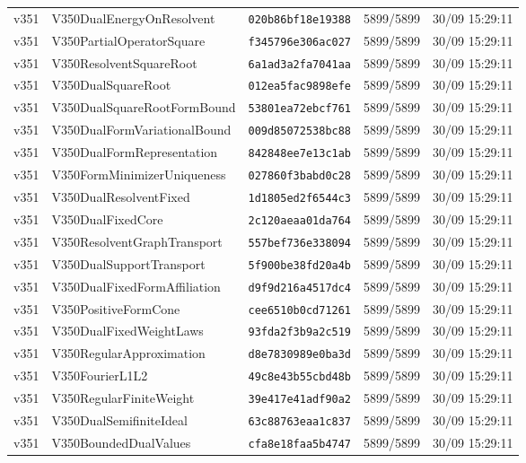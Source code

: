 \documentclass[11pt]{article}
\theoremstyle{definition}\newtheorem{deriv}{Derivation}
\begin{document}
{\begin{longtable}{@{}lllll@{}}
v351 & V350DualEnergyOnResolvent & \texttt{020b86bf18e19388} & 5899/5899 & 30/09 15:29:11 \\
v351 & V350PartialOperatorSquare & \texttt{f345796e306ac027} & 5899/5899 & 30/09 15:29:11 \\
v351 & V350ResolventSquareRoot & \texttt{6a1ad3a2fa7041aa} & 5899/5899 & 30/09 15:29:11 \\
v351 & V350DualSquareRoot & \texttt{012ea5fac9898efe} & 5899/5899 & 30/09 15:29:11 \\
v351 & V350DualSquareRootFormBound & \texttt{53801ea72ebcf761} & 5899/5899 & 30/09 15:29:11 \\
v351 & V350DualFormVariationalBound & \texttt{009d85072538bc88} & 5899/5899 & 30/09 15:29:11 \\
v351 & V350DualFormRepresentation & \texttt{842848ee7e13c1ab} & 5899/5899 & 30/09 15:29:11 \\
v351 & V350FormMinimizerUniqueness & \texttt{027860f3babd0c28} & 5899/5899 & 30/09 15:29:11 \\
v351 & V350DualResolventFixed & \texttt{1d1805ed2f6544c3} & 5899/5899 & 30/09 15:29:11 \\
v351 & V350DualFixedCore & \texttt{2c120aeaa01da764} & 5899/5899 & 30/09 15:29:11 \\
v351 & V350ResolventGraphTransport & \texttt{557bef736e338094} & 5899/5899 & 30/09 15:29:11 \\
v351 & V350DualSupportTransport & \texttt{5f900be38fd20a4b} & 5899/5899 & 30/09 15:29:11 \\
v351 & V350DualFixedFormAffiliation & \texttt{d9f9d216a4517dc4} & 5899/5899 & 30/09 15:29:11 \\
v351 & V350PositiveFormCone & \texttt{cee6510b0cd71261} & 5899/5899 & 30/09 15:29:11 \\
v351 & V350DualFixedWeightLaws & \texttt{93fda2f3b9a2c519} & 5899/5899 & 30/09 15:29:11 \\
v351 & V350RegularApproximation & \texttt{d8e7830989e0ba3d} & 5899/5899 & 30/09 15:29:11 \\
v351 & V350FourierL1L2 & \texttt{49c8e43b55cbd48b} & 5899/5899 & 30/09 15:29:11 \\
v351 & V350RegularFiniteWeight & \texttt{39e417e41adf90a2} & 5899/5899 & 30/09 15:29:11 \\
v351 & V350DualSemifiniteIdeal & \texttt{63c88763eaa1c837} & 5899/5899 & 30/09 15:29:11 \\
v351 & V350BoundedDualValues & \texttt{cfa8e18faa5b4747} & 5899/5899 & 30/09 15:29:11 \\

\end{longtable}}
\end{document}
